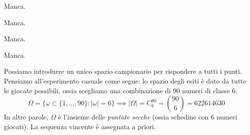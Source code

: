 \Soluzione

Manca.

\Soluzione

Manca.

\Soluzione

Manca.

\Soluzione

Manca.

\Soluzione

Possiamo introdurre un unico spazio campionario per rispondere a tutti i punti. Pensiamo all'esperimento casuale come segue: lo spazio degli esiti è dato da tutte le giocate possibili, ossia scegliamo una combinazione di $90$ numeri di classe $6$:
\[
	\Omega =\{\omega \subset \{1,\dots,90\} :|\omega| =6\} \implies |\Omega| =C_{6}^{90} =\binom{90}{6} =622614630
\]
In altre parole, $\Omega $ è l'insieme delle \emph{puntate secche} (ossia schedine con $6$ numeri giocati). La sequenza vincente è assegnata a priori.
